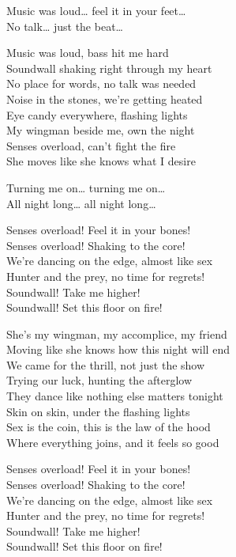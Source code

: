 \begin{lyrics}
Music was loud… feel it in your feet…\\
No talk… just the beat…

Music was loud, bass hit me hard\\
Soundwall shaking right through my heart\\
No place for words, no talk was needed\\
Noise in the stones, we’re getting heated\\
Eye candy everywhere, flashing lights\\
My wingman beside me, own the night\\
Senses overload, can’t fight the fire\\
She moves like she knows what I desire

Turning me on… turning me on…\\
All night long… all night long…

Senses overload! Feel it in your bones!\\
Senses overload! Shaking to the core!\\
We’re dancing on the edge, almost like sex\\
Hunter and the prey, no time for regrets!\\
Soundwall! Take me higher!\\
Soundwall! Set this floor on fire!

She’s my wingman, my accomplice, my friend\\
Moving like she knows how this night will end\\
We came for the thrill, not just the show\\
Trying our luck, hunting the afterglow\\
They dance like nothing else matters tonight\\
Skin on skin, under the flashing lights\\
Sex is the coin, this is the law of the hood\\
Where everything joins, and it feels so good

Senses overload! Feel it in your bones!\\
Senses overload! Shaking to the core!\\
We’re dancing on the edge, almost like sex\\
Hunter and the prey, no time for regrets!\\
Soundwall! Take me higher!\\
Soundwall! Set this floor on fire!


\end{lyrics}
